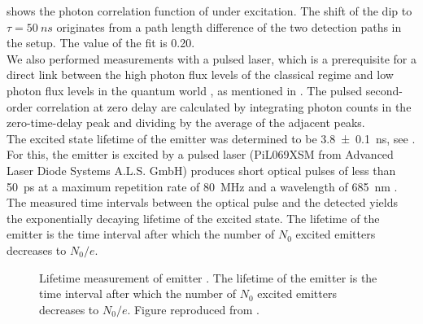 		 shows the photon correlation function of \emhtwo under \cw excitation.
		The shift of the dip to $\tau=\SI{50}{ns}$ originates from a path length difference of the two detection paths in the \HBT setup.
		The \gtz value of the fit is \num{0.20}.
		\\
		We also performed measurements with a pulsed laser, which is a prerequisite for a direct link between the high photon flux levels of the classical regime and low photon flux levels in the quantum world \cite{Vaigu2017,SiquteProject}, as mentioned in .
		The pulsed second-order correlation at zero delay \gtz are calculated by integrating photon counts in the zero-time-delay peak and dividing by the average of the adjacent peaks.
		\\
		The excited state lifetime of the emitter was determined to be \SI[separate-uncertainty]{3.8\pm0.1}{ns}, see .
		For this, the emitter is excited by a pulsed laser (PiL069XSM from Advanced Laser Diode Systems A.L.S. GmbH) produces short optical pulses of less than \SI{50}{\ps} at a maximum repetition rate of \SI{80}{\mega\hertz} and a wavelength of \SI{685}{\nm} \cite{Vaigu2017}. 
		The measured time intervals between the optical pulse and the detected \fl yields the exponentially decaying lifetime of the excited state.
		The lifetime of the emitter is the time interval after which the number of $N_0$ excited emitters decreases to $N_0/e$.
		\\
		
		\begin{figure}[!htb]
			\centering
			\caption{Lifetime measurement of emitter \emhtwo. The lifetime of the emitter is the time interval after which the number of $N_0$ excited emitters decreases to $N_0/e$. Figure reproduced from \cite{Vaigu2017}.}
			\label{fig::lifetime}
		\end{figure}

